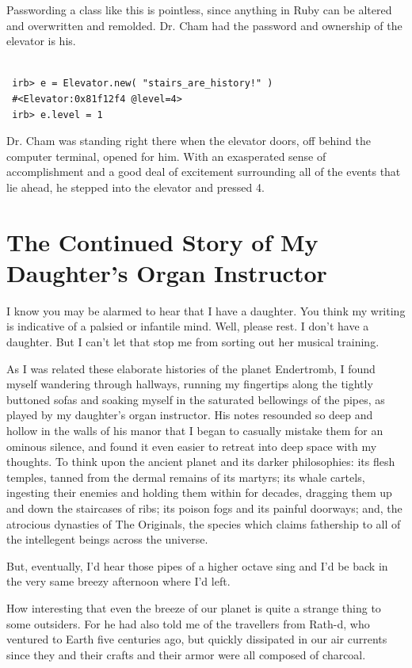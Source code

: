 \documentclass[10pt,twoside]{report}
\begin{document}
Passwording a class like this is pointless, since anything in Ruby can
be altered and overwritten and remolded.  Dr. Cham had the password
and ownership of the elevator is his.


\begin{lstlisting}

 irb> e = Elevator.new( "stairs_are_history!" )
 #<Elevator:0x81f12f4 @level=4>
 irb> e.level = 1

\end{lstlisting}


Dr. Cham was standing right there when the elevator doors, off behind
the computer terminal, opened for him.  With an exasperated sense of
accomplishment and a good deal of excitement surrounding all of the
events that lie ahead, he stepped into the elevator and pressed 4.

\newpage


\section{The Continued Story of My Daughter's Organ \mbox{Instructor}}


I know you may be alarmed to hear that I have a daughter.  You think
my writing is indicative of a palsied or infantile mind.  Well, please
rest.  I don't have a daughter. But I can't let that stop me from
sorting out her musical training.

As I was related these elaborate histories of the planet Endertromb, I
found myself wandering through hallways, running my fingertips along
the tightly buttoned sofas and soaking myself in the saturated
bellowings of the pipes, as played by my daughter's organ instructor.
His notes resounded so deep and hollow in the walls of his manor that
I began to casually mistake them for an ominous silence, and found it
even easier to retreat into deep space with my thoughts.  To think
upon the ancient planet and its darker philosophies: its flesh
temples, tanned from the dermal remains of its martyrs; its whale
cartels, ingesting their enemies and holding them within for decades,
dragging them up and down the staircases of ribs; its poison fogs and
its painful doorways; and, the atrocious dynasties of The Originals,
the species which claims fathership to all of the intellegent beings
across the universe.

But, eventually, I'd hear those pipes of a higher octave sing and I'd
be back in the very same breezy afternoon where I'd left.

How interesting that even the breeze of our planet is quite a strange
thing to some outsiders.  For he had also told me of the travellers
from Rath-d, who ventured to Earth five centuries ago, but quickly
dissipated in our air currents since they and their crafts and their
armor were all composed of charcoal.
\end{document}
